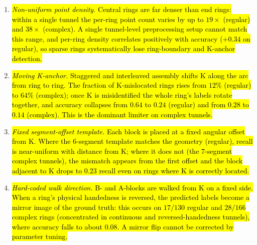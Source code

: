\begin{enumerate}
\item \hl{\emph{Non-uniform point density.} Central rings are far denser than end rings: within a single tunnel the per-ring point count varies by up to $19\times$ (regular) and $38\times$ (complex). A single tunnel-level preprocessing setup cannot match this range, and per-ring density correlates positively with accuracy ($+0.34$ on regular), so sparse rings systematically lose ring-boundary and K-anchor detection.}
\item \hl{\emph{Moving K-anchor.} Staggered and interleaved assembly shifts K along the arc from ring to ring. The fraction of K-mislocated rings rises from $12\%$ (regular) to $64\%$ (complex); once K is misidentified the whole ring's labels rotate together, and accuracy collapses from $0.64$ to $0.24$ (regular) and from $0.28$ to $0.14$ (complex). This is the dominant limiter on complex tunnels.}
\item \hl{\emph{Fixed segment-offset template.} Each block is placed at a fixed angular offset from K. Where the $6$-segment template matches the geometry (regular), recall is near-uniform with distance from K; where it does not (the $7$-segment complex tunnels), the mismatch appears from the first offset and the block adjacent to K drops to $0.23$ recall even on rings where K is correctly located.}
\item \hl{\emph{Hard-coded walk direction.} B- and A-blocks are walked from K on a fixed side. When a ring's physical handedness is reversed, the predicted labels become a mirror image of the ground truth: this occurs on $17/130$ regular and $28/166$ complex rings (concentrated in continuous and reversed-handedness tunnels), where accuracy falls to about $0.08$. A mirror flip cannot be corrected by parameter tuning.}
\end{enumerate}

